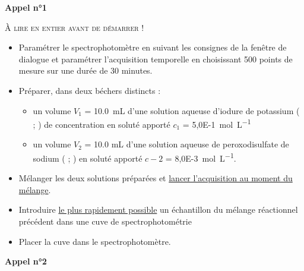 \documentclass[a4paper,11pt,fleqn]{article}%
\begin{document}
\begin{center}\textbf{Appel n°1}\end{center}

\noindent \colorbox{gray!20}{\begin{minipage}{\linewidth}
    \textsc{À lire en entier avant de démarrer !}
    \begin{itemize}
        \item Paramétrer le spectrophotomètre en suivant les consignes de la fenêtre de dialogue et paramétrer l'acquisition temporelle en choisissant 500 points de mesure sur une durée de 30 minutes.
        \item Préparer, dans deux béchers distincts :
        \begin{itemize}
            \item un volume $V_1$ = \SI{10,0}{\milli\liter} d'une solution aqueuse d'iodure de potassium ( ; ) de concentration en soluté apporté $c_1$ = \SI{5,0E-1}{\mole\per\liter}
            \item un volume $V_2$ = \num{10,0} \unit{\milli\liter} d'une solution aqueuse de peroxodisulfate de sodium ( ; ) en soluté apporté $c-2$ = \SI{8,0E-3}{\mole\per\liter}.
        \end{itemize}
        \item Mélanger les deux solutions préparées et \underline{lancer l'acquisition au moment du mélange}.
        \item Introduire \underline{le plus rapidement possible} un échantillon du mélange réactionnel précédent dans une cuve de spectrophotométrie
        \item Placer la cuve dans le spectrophotomètre.
    \end{itemize}
\end{minipage}}

\begin{center}\textbf{Appel n°2}\end{center}
\end{document}

